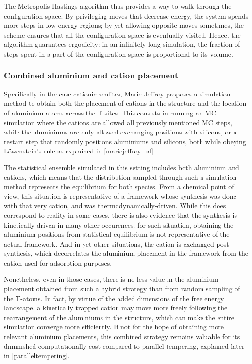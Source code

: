 \documentclass[main.tex]{subfiles}
\begin{document}
The Metropolis-Hastings algorithm thus provides a way to walk through the configuration space. By privileging moves that decrease energy, the system spends more steps in low energy regions; by yet allowing opposite moves sometimes, the scheme ensures that all the configuration space is eventually visited. Hence, the algorithm guarantees ergodicity: in an infinitely long simulation, the fraction of steps spent in a part of the configuration space is proportional to its volume. %


\subsubsection{Combined aluminium and cation placement} %

Specifically in the case cationic zeolites, Marie Jeffroy \cite{Jeffroy} proposes a simulation method to obtain both the placement of cations in the structure and the location of aluminium atoms across the T-sites. This consists in running an MC simulation where the cations are allowed all previously mentioned MC steps, while the aluminiums are only allowed exchanging positions with silicons, or a restart step that randomly positions aluminiums and silicons, both while obeying L\"owenstein's rule as explained in \cref{mariejeffroy_al}.

The statistical ensemble simulated in this setting includes both aluminium and cations, which means that the distribution sampled through such a simulation method represents the equilibrium for both species. From a chemical point of view, this situation is representative of a framework whose synthesis was done with that very cation, and was thermodynamically-driven. While this does correspond to reality in some cases, there is also evidence that the synthesis is kinetically-driven in many other occurences: for such situation, obtaining the aluminium positions from statistical equilibrium is not representative of the actual framework. And in yet other situations, the cation is exchanged post-synthesis, which decorrelates the aluminium placement in the framework from the cation used for adsorption purposes.

Nonetheless, even in those cases, there is no less value in the aluminium placement obtained from such a hybrid strategy than from random sampling of the T-atoms. In fact, by virtue of the added dimensions of the free energy landscape, a kinetically trapped cation may move more freely following the rearrangement of the aluminiums in the structure, which can make the entire simulation converge more efficiently. If not for the hope of obtaining more relevant aluminium placements, this combined strategy remains valuable for its diminished computationally cost compared to parallel tempering, explained later in \cref{paralleltempering}.
\end{document}
